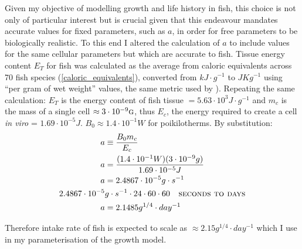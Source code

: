 \documentclass[a4paper]{article} %
\begin{document}
Given my objective of modelling growth and life history in fish, this choice is not only of particular interest but is crucial given that this endeavour mandates accurate values for fixed parameters, such as $a$, in order for free parameters to be biologically realistic. To this end I altered the \textcite{West2001} calculation of $a$ to include values for the same cellular parameters but which are accurate to fish. Tissue energy content $E_T$ for fish was calculated as the average from caloric equivalents across 70 fish species \autocite{Cummins1971, Steimle1980, Hartman1995} (\cref{caloric_equivalents}), converted from $kJ\cdot g^{-1}$ to $JKg^{-1}$ using ``per gram of wet weight'' values, the same metric used by \textcite{West2001}). Repeating the same calculation: $E_T$ is the energy content of fish tissue $= 5.63 \cdot 10^3 J\cdot g^{-1}$ and $m_c$ is the mass of a single cell $\approx 3 \cdot 10^{-9} \textsc{g}$, thus $E_c$, the energy required to create a cell \textit{in viro} = $1.69 \cdot 10^{-5} J$. $B_0 \approx 1.4 \cdot 10^{-1} W$ for poikilotherms. By substitution:
\begin{align*}
    a &\equiv \frac{B_{0}m_{c}}{E_{c}} \\
    a &= \frac{(1.4 \cdot 10^{-1} W)(3 \cdot 10^{-9} g)}{1.69 \cdot 10^{-5} J}\\
    a &= 2.4867 \cdot 10^{-5}g\cdot s^{-1} \\
    2.4867 \cdot 10^{-5}&g\cdot s^{-1} \cdot 24 \cdot 60 \cdot 60 \ \ \textsc{   seconds to days}\\
    a &= 2.1485 g^{1/4}\cdot day^{-1}
\end{align*}

Therefore intake rate of fish is expected to scale as $\approx 2.15g^{1/4}\cdot day^{-1}$ which I use in my parameterisation of the growth model.
\end{document}
